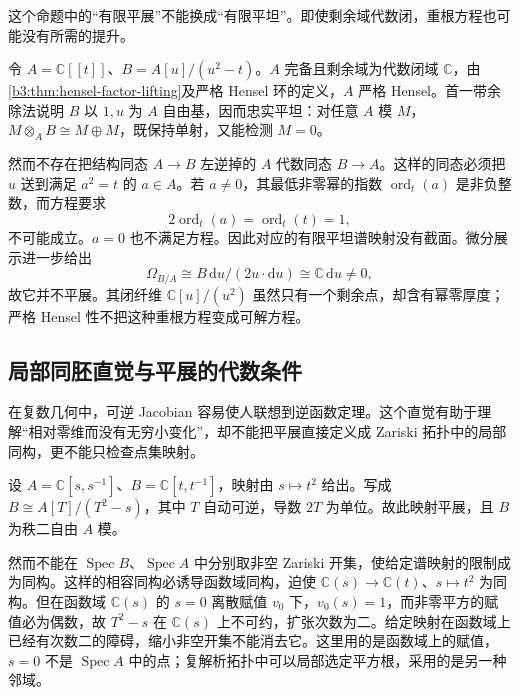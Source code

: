 这个命题中的“有限平展”不能换成“有限平坦”。即使剩余域代数闭，重根方程也可能没有所需的提升。

\begin{example}\label{b3:exm:strict-henselian-flat-not-split}
	令 \(A=\mathbb C[\![t]\!]\)、\(B=A[u]/(u^2-t)\)。\(A\) 完备且剩余域为代数闭域 \(\mathbb C\)，由\cref{b3:thm:hensel-factor-lifting}及严格 Hensel 环的定义，\(A\) 严格 Hensel。首一带余除法说明 \(B\) 以 \(1,u\) 为 \(A\) 自由基，因而忠实平坦：对任意 \(A\) 模 \(M\)，\(M\otimes_AB\cong M\oplus M\)，既保持单射，又能检测 \(M=0\)。

	然而不存在把结构同态 \(A\to B\) 左逆掉的 \(A\) 代数同态 \(B\to A\)。这样的同态必须把 \(u\) 送到满足 \(a^2=t\) 的 \(a\in A\)。若 \(a\ne0\)，其最低非零幂的指数 \(\operatorname{ord}_t(a)\) 是非负整数，而方程要求
	\[
		2\operatorname{ord}_t(a)=\operatorname{ord}_t(t)=1,
	\]
	不可能成立。\(a=0\) 也不满足方程。因此对应的有限平坦谱映射没有截面。微分展示进一步给出
	\[
		\Omega_{B/A}\cong B\,\mathrm{d}u/(2u\cdot\mathrm{d}u) \cong\mathbb C\,\mathrm{d}u\ne0,
	\]
	故它并不平展。其闭纤维 \(\mathbb C[u]/(u^2)\) 虽然只有一个剩余点，却含有幂零厚度；严格 Hensel 性不把这种重根方程变成可解方程。
\end{example}

\subsection{局部同胚直觉与平展的代数条件}
\label{b3:subsec:2303:03}

在复数几何中，可逆 Jacobian 容易使人联想到逆函数定理。这个直觉有助于理解“相对零维而没有无穷小变化”，却不能把平展直接定义成 Zariski 拓扑中的局部同构，更不能只检查点集映射。

\begin{example}\label{b3:exm:etale-not-zariski-isomorphism}
	设 \(A=\mathbb C[s,s^{-1}]\)、\(B=\mathbb C[t,t^{-1}]\)，映射由 \(s\mapsto t^2\) 给出。写成 \(B\cong A[T]/(T^2-s)\)，其中 \(T\) 自动可逆，导数 \(2T\) 为单位。故此映射平展，且 \(B\) 为秩二自由 \(A\) 模。

	\ProseParagraphBreak
	然而不能在 \(\operatorname{Spec}B\)、\(\operatorname{Spec}A\) 中分别取非空 Zariski 开集，使给定谱映射的限制成为同构。这样的相容同构必诱导函数域同构，迫使 \(\mathbb C(s)\to\mathbb C(t)\)、\(s\mapsto t^2\) 为同构。但在函数域 \(\mathbb C(s)\) 的 \(s=0\) 离散赋值 \(v_0\) 下，\(v_0(s)=1\)，而非零平方的赋值必为偶数，故 \(T^2-s\) 在 \(\mathbb C(s)\) 上不可约，扩张次数为二。给定映射在函数域上已经有次数二的障碍，缩小非空开集不能消去它。这里用的是函数域上的赋值，\(s=0\) 不是 \(\operatorname{Spec}A\) 中的点；复解析拓扑中可以局部选定平方根，采用的是另一种邻域。
\end{example}


